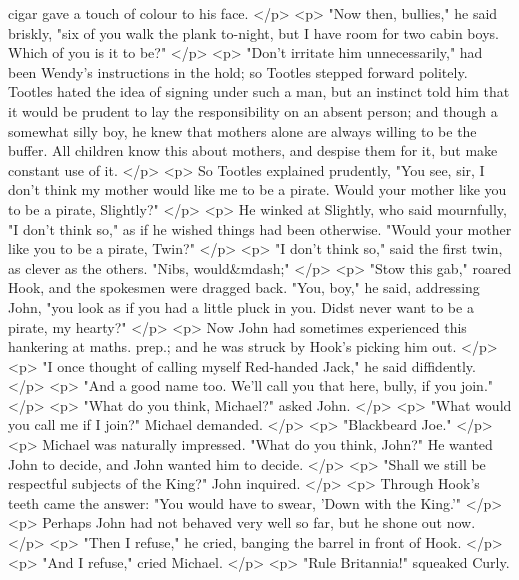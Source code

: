       cigar gave a touch of colour to his face.
    </p>
    <p>
      "Now then, bullies," he said briskly, "six of you walk the plank to-night,
      but I have room for two cabin boys. Which of you is it to be?"
    </p>
    <p>
      "Don't irritate him unnecessarily," had been Wendy's instructions in the
      hold; so Tootles stepped forward politely. Tootles hated the idea of
      signing under such a man, but an instinct told him that it would be
      prudent to lay the responsibility on an absent person; and though a
      somewhat silly boy, he knew that mothers alone are always willing to be
      the buffer. All children know this about mothers, and despise them for it,
      but make constant use of it.
    </p>
    <p>
      So Tootles explained prudently, "You see, sir, I don't think my mother
      would like me to be a pirate. Would your mother like you to be a pirate,
      Slightly?"
    </p>
    <p>
      He winked at Slightly, who said mournfully, "I don't think so," as if he
      wished things had been otherwise. "Would your mother like you to be a
      pirate, Twin?"
    </p>
    <p>
      "I don't think so," said the first twin, as clever as the others. "Nibs,
      would&mdash;"
    </p>
    <p>
      "Stow this gab," roared Hook, and the spokesmen were dragged back. "You,
      boy," he said, addressing John, "you look as if you had a little pluck in
      you. Didst never want to be a pirate, my hearty?"
    </p>
    <p>
      Now John had sometimes experienced this hankering at maths. prep.; and he
      was struck by Hook's picking him out.
    </p>
    <p>
      "I once thought of calling myself Red-handed Jack," he said diffidently.
    </p>
    <p>
      "And a good name too. We'll call you that here, bully, if you join."
    </p>
    <p>
      "What do you think, Michael?" asked John.
    </p>
    <p>
      "What would you call me if I join?" Michael demanded.
    </p>
    <p>
      "Blackbeard Joe."
    </p>
    <p>
      Michael was naturally impressed. "What do you think, John?" He wanted John
      to decide, and John wanted him to decide.
    </p>
    <p>
      "Shall we still be respectful subjects of the King?" John inquired.
    </p>
    <p>
      Through Hook's teeth came the answer: "You would have to swear, 'Down with
      the King.'"
    </p>
    <p>
      Perhaps John had not behaved very well so far, but he shone out now.
    </p>
    <p>
      "Then I refuse," he cried, banging the barrel in front of Hook.
    </p>
    <p>
      "And I refuse," cried Michael.
    </p>
    <p>
      "Rule Britannia!" squeaked Curly.
